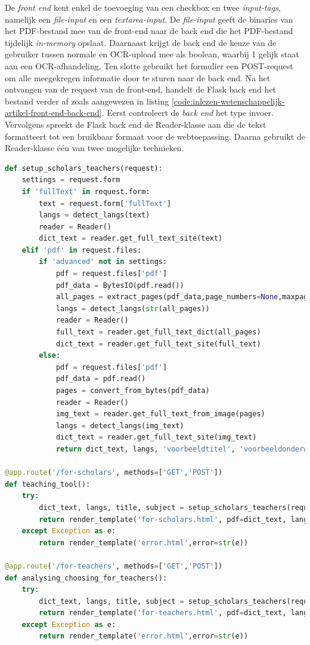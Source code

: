 \medspace

De \textit{front end} kent enkel de toevoeging van een checkbox en twee \textit{input-tags}, namelijk een \textit{file-input} en een \textit{textarea-input}. De \textit{file-input} geeft de binaries van het PDF-bestand mee van de front-end naar de back end die het PDF-bestand tijdelijk \textit{in-memory} opslaat. Daarnaast krijgt de back end de keuze van de gebruiker tussen normale en OCR-upload mee als boolean, waarbij 1 gelijk staat aan een OCR-afhandeling. Ten slotte gebruikt het formulier een POST-request om alle meegekregen informatie door te sturen naar de back end. Na het ontvangen van de request van de front-end, handelt de Flask back end het bestand verder af zoals aangewezen in listing \ref{code:inlezen-wetenschappelijk-artikel-front-end-back-end}. Eerst controleert de \textit{back end} het type invoer. Vervolgens spreekt de Flask back end de Reader-klasse aan die de tekst formatteert tot een bruikbaar formaat voor de webtoepassing. Daarna gebruikt de Reader-klasse één van twee mogelijke technieken. 

\begin{lstlisting}[language=Python, caption={Koppeling tussen front-end en back-end voor het inlezen van een wetenschappelijk artikel}, label={code:inlezen-wetenschappelijk-artikel-front-end-back-end}]
def setup_scholars_teachers(request):
	settings = request.form
	if 'fullText' in request.form:
		text = request.form['fullText']
		langs = detect_langs(text)
		reader = Reader()
		dict_text = reader.get_full_text_site(text)                
	elif 'pdf' in request.files:
		if 'advanced' not in settings:
			pdf = request.files['pdf']
			pdf_data = BytesIO(pdf.read())
			all_pages = extract_pages(pdf_data,page_numbers=None,maxpages=999)
			langs = detect_langs(str(all_pages))
			reader = Reader()
			full_text = reader.get_full_text_dict(all_pages)
			dict_text = reader.get_full_text_site(full_text)
		else:
			pdf = request.files['pdf']
			pdf_data = pdf.read()
			pages = convert_from_bytes(pdf_data)
			reader = Reader()
			img_text = reader.get_full_text_from_image(pages)
			langs = detect_langs(img_text)
			dict_text = reader.get_full_text_site(img_text)                            
			return dict_text, langs, 'voorbeeldtitel', 'voorbeeldonderwerp'
			
@app.route('/for-scholars', methods=['GET','POST'])
def teaching_tool():
	try:
		dict_text, langs, title, subject = setup_scholars_teachers(request)
		return render_template('for-scholars.html', pdf=dict_text, lang=langs, title=title, subject=subject)
	except Exception as e:
		return render_template('error.html',error=str(e))
	
@app.route('/for-teachers', methods=['GET','POST'])
def analysing_choosing_for_teachers():
	try:
		dict_text, langs, title, subject = setup_scholars_teachers(request)
		return render_template('for-teachers.html', pdf=dict_text, lang=langs, title=title, subject=subject)
	except Exception as e:
		return render_template('error.html',error=str(e))
\end{lstlisting}

